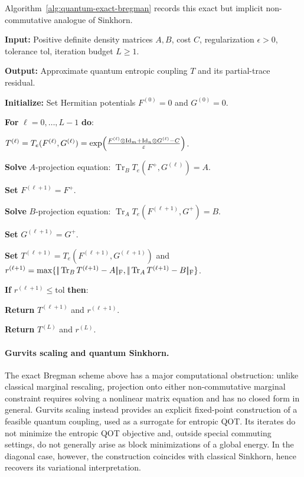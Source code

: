 Algorithm~\ref{alg:quantum-exact-bregman} records this exact but implicit non-commutative analogue of Sinkhorn.

\begin{alg}\label{alg:quantum-exact-bregman}
\textbf{Input:} Positive definite density matrices $A,B$, cost $C$, regularization $\epsilon>0$, tolerance $\mathrm{tol}$, iteration budget $L\geq1$.

\textbf{Output:} Approximate quantum entropic coupling $T$ and its partial-trace residual.

\textbf{Initialize:} Set Hermitian potentials $F^{(0)}=0$ and $G^{(0)}=0$.

\textbf{For} $\ell=0,\ldots,L-1$ \textbf{do}:
\begin{algblock}
\(T^{(\ell)}= T_e(F^{(\ell)},G^{(\ell)}) = \exp\!\left( \frac{F^{(\ell)}\otimes\mathrm{Id}_m+\mathrm{Id}_n\otimes G^{(\ell)}-C}{\varepsilon} \right)\).

\textbf{Solve} $A$-projection equation:
\(\operatorname{Tr}_B T_e(F^+,G^{(\ell)})=A\).

\textbf{Set} $F^{(\ell+1)}=F^+$.

\textbf{Solve} $B$-projection equation:
\(\operatorname{Tr}_A T_e(F^{(\ell+1)},G^+)=B\).

\textbf{Set} $G^{(\ell+1)}=G^+$.

\textbf{Set} $T^{(\ell+1)}=T_e(F^{(\ell+1)},G^{(\ell+1)})$ and
\(r^{(\ell+1)}=\max\{|\!| \operatorname{Tr}_B T^{(\ell+1)}-A |\!|_{\mathrm F},|\!| \operatorname{Tr}_A T^{(\ell+1)}-B |\!|_{\mathrm F}\}\).

\textbf{If} $r^{(\ell+1)}\leq\mathrm{tol}$ \textbf{then}:
\begin{algblock}
\textbf{Return} $T^{(\ell+1)}$ and $r^{(\ell+1)}$.
\end{algblock}
\end{algblock}
\algreturnskip
\textbf{Return} $T^{(L)}$ and $r^{(L)}$.
\end{alg}

\paragraph{Gurvits scaling and quantum Sinkhorn.}
The exact Bregman scheme above has a major computational obstruction: unlike classical marginal rescaling, projection onto either non-commutative marginal constraint requires solving a nonlinear matrix equation and has no closed form in general. Gurvits scaling instead provides an explicit fixed-point construction of a feasible quantum coupling, used as a surrogate for entropic QOT\@. Its iterates do not minimize the entropic QOT objective and, outside special commuting settings, do not generally arise as block minimizations of a global energy. In the diagonal case, however, the construction coincides with classical Sinkhorn, hence recovers its variational interpretation.

